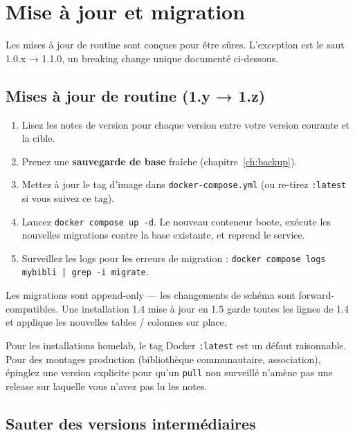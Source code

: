 \chapter{Mise à jour et migration}
\label{ch:upgrade}

Les mises à jour de routine sont conçues pour être sûres.
L'exception est le saut 1.0.x → 1.1.0, un breaking change unique
documenté ci-dessous.

\section{Mises à jour de routine (1.y → 1.z)}

\begin{enumerate}
  \item Lisez les notes de version pour chaque version entre votre
        version courante et la cible.
  \item Prenez une \textbf{sauvegarde de base} fraîche
        (chapitre~\ref{ch:backup}).
  \item Mettez à jour le tag d'image dans
        \texttt{docker-compose.yml} (ou re-tirez \texttt{:latest}
        si vous suivez ce tag).
  \item Lancez \texttt{docker compose up -d}. Le nouveau conteneur
        boote, exécute les nouvelles migrations contre la base
        existante, et reprend le service.
  \item Surveillez les logs pour les erreurs de migration :
        \texttt{docker compose logs mybibli | grep -i migrate}.
\end{enumerate}

Les migrations sont append-only — les changements de schéma sont
forward-compatibles. Une installation 1.4 mise à jour en 1.5 garde
toutes les lignes de 1.4 et applique les nouvelles tables /
colonnes sur place.

\begin{tip}
Pour les installations homelab, le tag Docker \texttt{:latest} est
un défaut raisonnable. Pour des montages production
(bibliothèque communautaire, association), épinglez une version
explicite pour qu'un \texttt{pull} non surveillé n'amène pas une
release sur laquelle vous n'avez pas lu les notes.
\end{tip}

\section{Sauter des versions intermédiaires}

